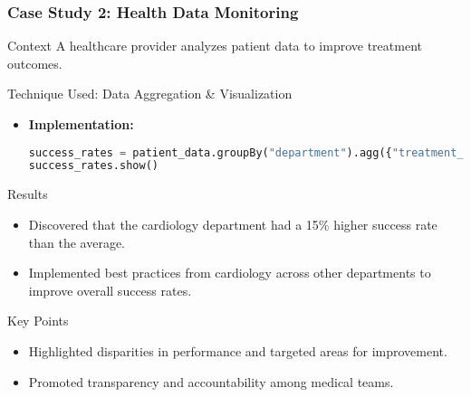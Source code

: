 \documentclass[aspectratio=169]{beamer}
\begin{document}
\begin{frame}[fragile]
    \frametitle{Case Study 2: Health Data Monitoring}
    \begin{block}{Context}
        A healthcare provider analyzes patient data to improve treatment outcomes.
    \end{block}
    
    \begin{block}{Technique Used: Data Aggregation \& Visualization}
        \begin{itemize}
            \item \textbf{Implementation:}
            \begin{lstlisting}[language=Python, caption=Data Aggregation Code Example]
success_rates = patient_data.groupBy("department").agg({"treatment_success": "avg"})
success_rates.show()
            \end{lstlisting}
        \end{itemize}
    \end{block}
    
    \begin{block}{Results}
        \begin{itemize}
            \item Discovered that the cardiology department had a 15\% higher success rate than the average.
            \item Implemented best practices from cardiology across other departments to improve overall success rates.
        \end{itemize}
    \end{block}
    
    \begin{block}{Key Points}
        \begin{itemize}
            \item Highlighted disparities in performance and targeted areas for improvement.
            \item Promoted transparency and accountability among medical teams.
        \end{itemize}
    \end{block}
\end{frame}
\end{document}
